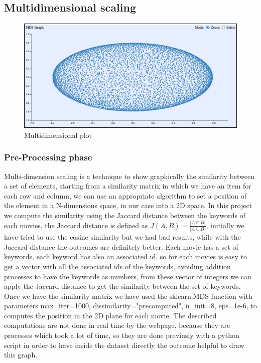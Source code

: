 \documentclass[]{article}
\begin{document}
\subsection{Multidimensional scaling}
\begin{figure}[H]
	\centering
	\includegraphics[width=1\linewidth]{images/mds_plot}
	\caption{Multidimensional plot}
	\label{fig:mdsplot}
\end{figure}
\subsubsection{Pre-Processing phase}
Multi-dimension scaling is a technique to show graphically the similarity between a set of elements, starting from a similarity matrix in which we have an item for each row and column, we can use an appropriate algorithm to set a position of the element in a N-dimensions space, in our case into a 2D space.\newline
In this project we compute the similarity using the Jaccard distance between the keywords of each movies, the Jaccard distance is defined as $J(A,B)=\frac{|A\cap B|}{|A\cup B|}$, initially we have tried to use the cosine similarity but we had bad results, while with the Jaccard distance the outcomes are definitely better.\newline
Each movie has a set of keywords, each keyword has also an associated id, so for each movies is easy to get a vector with all the associated ids of the keywords, avoiding addition processes to have the keywords as numbers, from these vector of integers we can apply the Jaccard distance to get the similarity between the set of keywords.\newline
Once we have the similarity matrix we have used the sklearn.MDS function with parameters max\_iter=1000, dissimilarity="precomputed", n\_init=8, eps=1e-6, to computes the position in the 2D plane for each movie.\newline
The described computations are not done in real time by the webpage, because they are processes which took a lot of time, so they are done previusly with a python script in order to have inside the dataset directly the outcome helpful to draw this graph.
\end{document}
